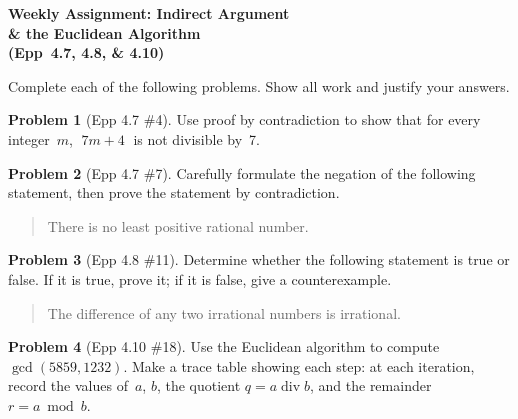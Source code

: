 \documentclass[11pt]{article}
\begin{document}
\begin{center}
  {\Large\bfseries Weekly Assignment: Indirect Argument\\[2pt]
   \& the Euclidean Algorithm\\[2pt]
   (Epp~4.7, 4.8, \& 4.10)}
\end{center}

\bigskip

\noindent
Complete each of the following problems.  Show all work and justify your answers.

\bigskip

\noindent\textbf{Problem 1} (Epp 4.7 \#4). \;
Use proof by contradiction to show that for every integer~$m$,
$\;7m + 4\;$ is not divisible by~7.

\bigskip

\noindent\textbf{Problem 2} (Epp 4.7 \#7). \;
Carefully formulate the negation of the following statement,
then prove the statement by contradiction.

\begin{quote}
  There is no least positive rational number.
\end{quote}

\bigskip

\noindent\textbf{Problem 3} (Epp 4.8 \#11). \;
Determine whether the following statement is true or false.
If it is true, prove it; if it is false, give a counterexample.

\begin{quote}
  The difference of any two irrational numbers is irrational.
\end{quote}

\bigskip

\noindent\textbf{Problem 4} (Epp 4.10 \#18). \;
Use the Euclidean algorithm to compute
$\gcd(5859, 1232)$.  Make a trace table showing each step:
at each iteration, record the values of~$a$, $b$,
the quotient $q = a \operatorname{div} b$, and the
remainder $r = a \bmod b$.
\end{document}
